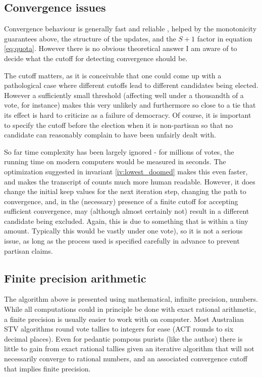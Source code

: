 \documentclass{article}
\begin{document}
\subsection{Convergence issues}

Convergence behaviour is generally fast and reliable \cite{meek_nouvelle_1969,meek_1969_en,meek_1970_en}, helped by the 
monotonicity guarantees above, the structure of the updates, and the $S+1$
factor in equation \ref{eq:quota}. However there is no obvious theoretical answer
I am aware of to decide what the cutoff for detecting convergence should be.

The cutoff matters, as it is conceivable that one could come up with a
pathological case where different cutoffs lead to different candidates being
elected. However a sufficiently small threshold (affecting well under a thousandth of a
vote, for instance) makes this very unlikely and furthermore so close to a tie
that its effect is hard to criticize as a failure of democracy. Of course, it is
important to specify the cutoff before the election when it is non-partisan so
that no candidate can reasonably complain to have been unfairly dealt with.

So far time complexity has been largely ignored - for millions of votes, the
running time on modern computers would be measured in seconds. The optimization
suggested in invariant \ref{iv:lowest_doomed} makes this even faster, and makes
the transcript of counts much more human readable. However, it does change the initial
keep values for the next iteration step, changing the path to convergence, and,
in the (necessary) presence of a finite cutoff for accepting sufficient convergence,
may (although almost certainly not) result in a different candidate being excluded.
Again, this is due to something that is within a tiny amount. Typically this would
be vastly under one vote), so it is not a serious issue, as long as the 
process used is specified carefully in advance to prevent partisan claims.

\subsection{Finite precision arithmetic}

The algorithm above is presented using mathematical, infinite precision, numbers.
While all computations could in principle be done with exact rational arithmetic,
a finite precision is usually easier to work with on computer. Most Australian STV
algorithms round vote tallies to integers for ease (ACT rounds to six decimal places).
Even for pedantic pompous purists (like the author) there is little to gain from
exact rational tallies given an iterative algorithm that will not necessarily converge
to rational numbers, and an associated convergence cutoff that implies finite
precision.
\end{document}
